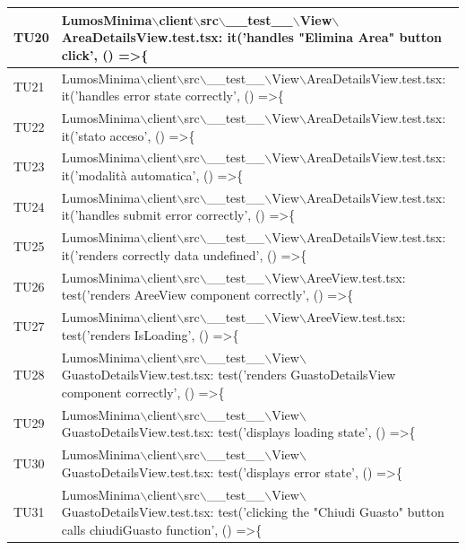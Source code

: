 \documentclass[12pt]{article}
\begin{document}
\begin{xltabular}{\linewidth}{|>{\hsize}X|X|}
	TU20 & LumosMinima$\backslash$client$\backslash$src$\backslash$\_\_test\_\_$\backslash$View$\backslash$AreaDetailsView.test.tsx: it('handles "Elimina Area" button click', () =\textgreater \{ \\ \hline
	TU21 & LumosMinima$\backslash$client$\backslash$src$\backslash$\_\_test\_\_$\backslash$View$\backslash$AreaDetailsView.test.tsx: it('handles error state correctly', () =\textgreater \{ \\ \hline
	TU22 & LumosMinima$\backslash$client$\backslash$src$\backslash$\_\_test\_\_$\backslash$View$\backslash$AreaDetailsView.test.tsx: it('stato acceso', () =\textgreater \{ \\ \hline
	TU23 & LumosMinima$\backslash$client$\backslash$src$\backslash$\_\_test\_\_$\backslash$View$\backslash$AreaDetailsView.test.tsx: it('modalità automatica', () =\textgreater \{ \\ \hline
	TU24 & LumosMinima$\backslash$client$\backslash$src$\backslash$\_\_test\_\_$\backslash$View$\backslash$AreaDetailsView.test.tsx: it('handles submit error correctly', () =\textgreater \{ \\ \hline
	TU25 & LumosMinima$\backslash$client$\backslash$src$\backslash$\_\_test\_\_$\backslash$View$\backslash$AreaDetailsView.test.tsx: it('renders correctly data undefined', () =\textgreater \{ \\ \hline
	TU26 & LumosMinima$\backslash$client$\backslash$src$\backslash$\_\_test\_\_$\backslash$View$\backslash$AreeView.test.tsx: test('renders AreeView component correctly', () =\textgreater \{ \\ \hline
	TU27 & LumosMinima$\backslash$client$\backslash$src$\backslash$\_\_test\_\_$\backslash$View$\backslash$AreeView.test.tsx: test('renders IsLoading', () =\textgreater \{ \\ \hline
	TU28 & LumosMinima$\backslash$client$\backslash$src$\backslash$\_\_test\_\_$\backslash$View$\backslash$GuastoDetailsView.test.tsx: test('renders GuastoDetailsView component correctly', () =\textgreater \{ \\ \hline
	TU29 & LumosMinima$\backslash$client$\backslash$src$\backslash$\_\_test\_\_$\backslash$View$\backslash$GuastoDetailsView.test.tsx: test('displays loading state', () =\textgreater \{ \\ \hline
	TU30 & LumosMinima$\backslash$client$\backslash$src$\backslash$\_\_test\_\_$\backslash$View$\backslash$GuastoDetailsView.test.tsx: test('displays error state', () =\textgreater \{ \\ \hline
	TU31 & LumosMinima$\backslash$client$\backslash$src$\backslash$\_\_test\_\_$\backslash$View$\backslash$GuastoDetailsView.test.tsx: test('clicking the "Chiudi Guasto" button calls chiudiGuasto function', () =\textgreater \{ \\ \hline

\end{xltabular}
\end{document}
